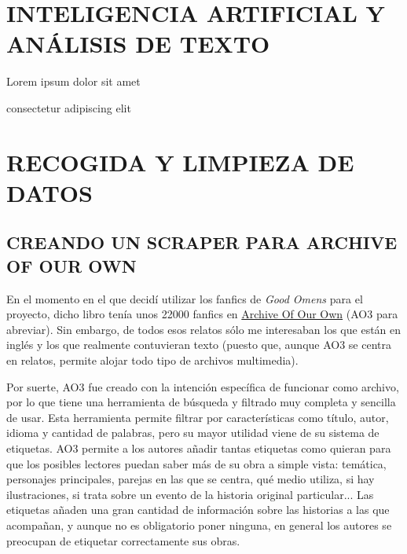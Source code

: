 \documentclass{pre-tfg}
\begin{document}
\section{INTELIGENCIA ARTIFICIAL Y ANÁLISIS DE TEXTO}
Lorem ipsum dolor sit amet 

consectetur adipiscing elit 





\section{RECOGIDA Y LIMPIEZA DE DATOS}

\subsection{CREANDO UN SCRAPER PARA ARCHIVE OF OUR OWN}
\label{sec:recogidadatos}

En el momento en el que decidí utilizar los fanfics de \textit{Good Omens} para el proyecto, dicho libro tenía unos 22000 fanfics en \href{archiveofourown.org}{Archive Of Our Own} (AO3 para abreviar). Sin embargo, de todos esos relatos sólo me interesaban los que están en inglés y los que realmente contuvieran texto (puesto que, aunque AO3 se centra en relatos, permite alojar todo tipo de archivos multimedia).

Por suerte, AO3 fue creado con la intención específica de funcionar como archivo, por lo que tiene una herramienta de búsqueda y filtrado muy completa y sencilla de usar. Esta herramienta permite filtrar por características como título, autor, idioma y cantidad de palabras, pero su mayor utilidad viene de su sistema de etiquetas. AO3 permite a los autores añadir tantas etiquetas como quieran para que los posibles lectores puedan saber más de su obra a simple vista: temática, personajes principales, parejas en las que se centra, qué medio utiliza, si hay ilustraciones, si trata sobre un evento de la historia original particular... Las etiquetas añaden una gran cantidad de información sobre las historias a las que acompañan, y aunque no es obligatorio poner ninguna, en general los autores se preocupan de etiquetar correctamente sus obras.
\end{document}
